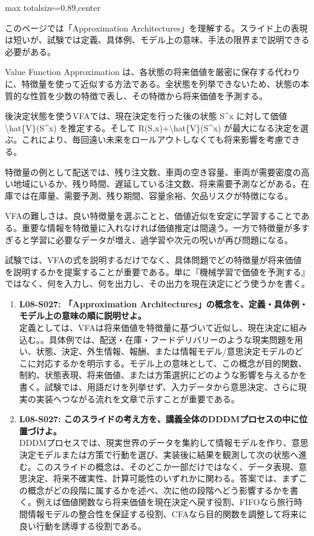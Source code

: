 \begin{minipage}[t]{0.58\textwidth}
\begin{adjustbox}{max totalsize={\textwidth}{0.89\textheight},center}
\begin{minipage}{\textwidth}\scriptsize
{}このページでは「Approximation Architectures」を理解する。スライド上の表現は短いが、試験では定義、具体例、モデル上の意味、手法の限界まで説明できる必要がある。\par
Value Function Approximation は、各状態の将来価値を厳密に保存する代わりに、特徴量を使って近似する方法である。全状態を列挙できないため、状態の本質的な性質を少数の特徴で表し、その特徴から将来価値を予測する。\par
後決定状態を使うVFAでは、現在決定を行った後の状態 S\textasciicircum{}x に対して価値 \textbackslash{}hat\{V\}(S\textasciicircum{}x) を推定する。そして R(S,x)+\textbackslash{}hat\{V\}(S\textasciicircum{}x) が最大になる決定を選ぶ。これにより、毎回遠い未来をロールアウトしなくても将来影響を考慮できる。\par
特徴量の例として配送では、残り注文数、車両の空き容量、車両が需要密度の高い地域にいるか、残り時間、遅延している注文数、将来需要予測などがある。在庫では在庫量、需要予測、残り期間、容量余裕、欠品リスクが特徴になる。\par
VFAの難しさは、良い特徴量を選ぶことと、価値近似を安定に学習することである。重要な情報を特徴量に入れなければ価値推定は間違う。一方で特徴量が多すぎると学習に必要なデータが増え、過学習や次元の呪いが再び問題になる。\par
試験では、VFAの式を説明するだけでなく、具体問題でどの特徴量が将来価値を説明するかを提案することが重要である。単に『機械学習で価値を予測する』ではなく、何を入力し、何を出力し、その出力を現在決定にどう使うかを書く。\par{}\begin{enumerate}\item \textbf{L08-S027: 「Approximation Architectures」の概念を、定義・具体例・モデル上の意味の順に説明せよ。}\\定義としては、VFAは将来価値を特徴量に基づいて近似し、現在決定に組み込む。。具体例では、配送・在庫・フードデリバリーのような現実問題を用い、状態、決定、外生情報、報酬、または情報モデル/意思決定モデルのどこに対応するかを明示する。モデル上の意味として、この概念が目的関数、制約、状態表現、将来価値、または方策選択にどのような影響を与えるかを書く。試験では、用語だけを列挙せず、入力データから意思決定、さらに現実の実装へつながる流れを文章で示すことが重要である。\item \textbf{L08-S027: このスライドの考え方を、講義全体のDDDMプロセスの中に位置づけよ。}\\DDDMプロセスでは、現実世界のデータを集約して情報モデルを作り、意思決定モデルまたは方策で行動を選び、実装後に結果を観測して次の状態へ進む。このスライドの概念は、そのどこか一部だけではなく、データ表現、意思決定、将来不確実性、計算可能性のいずれかに関わる。答案では、まずこの概念がどの段階に属するかを述べ、次に他の段階へどう影響するかを書く。例えば価値関数なら将来価値を現在決定へ戻す役割、FIFOなら旅行時間情報モデルの整合性を保証する役割、CFAなら目的関数を調整して将来に良い行動を誘導する役割である。\end{enumerate}

\end{minipage}
\end{adjustbox}
\end{minipage}
